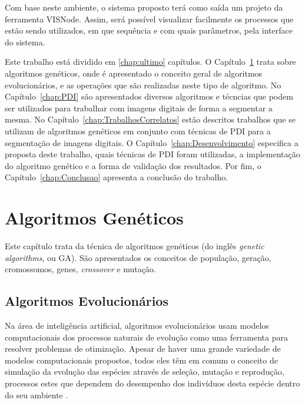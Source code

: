 \documentclass[12pt,oneside,a4paper,english,french,spanish,brazil,]{abntex2}
\begin{document}
Com base neste ambiente, o sistema proposto terá como saída um projeto da ferramenta VISNode. Assim, será possível visualizar facilmente os processos que estão sendo utilizados, em que sequência e com quais parâmetros, pela interface do sistema.

Este trabalho está dividido em \ref{chap:ultimo} capítulos. O Capítulo~\ref{chap:AlgoritmosGeneticos} trata sobre algoritmos genéticos, onde é apresentado o conceito geral de algoritmos evolucionários, e as operações que são realizadas neste tipo de algoritmo. No Capítulo~\ref{chap:PDI} são apresentados diversos algoritmos e técncias que podem ser utilizados para trabalhar com imagens digitais de forma a segmentar a mesma. No Capítulo~\ref{chap:TrabalhosCorrelatos} estão descritos trabalhos que se utilizam de algoritmos genéticos em conjunto com técnicas de PDI para a segmentação de imagens digitais. O Capítulo~\ref{chap:Desenvolvimento} especifica a proposta deste trabalho, quais técnicas de PDI foram utilizadas, a implementação do algoritmo genético e a forma de validação dos resultados. Por fim, o Capítulo~\ref{chap:Conclusao} apresenta a conclusão do trabalho.

\chapter{Algoritmos Genéticos}
\label{chap:AlgoritmosGeneticos}

Este capítulo trata da técnica de algoritmos genéticos (do inglês \textit{genetic algorithms}, ou GA). São apresentados os conceitos de população, geração, cromossomos, genes, \textit{crossover} e mutação.

\section{Algoritmos Evolucionários}

Na área de inteligência artificial, algoritmos evolucionários usam modelos computacionais dos processos naturais de evolução como uma ferramenta para resolver problemas de otimização. Apesar de haver uma grande variedade de modelos computacionais propostos, todos eles têm em comum o conceito de simulação da evolução das espécies através de seleção, mutação e reprodução, processos estes que dependem do desempenho dos indivíduos desta espécie dentro do seu ambiente \cite{linden:2008}.
\end{document}
